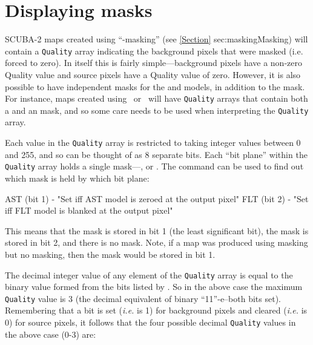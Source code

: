 \section{Displaying masks}
\label{sec:maskshow}

SCUBA-2 maps created using ``-masking'' (see \cref{Section}
{sec:masking}{Masking}) will contain a \texttt{Quality} array indicating the
background pixels that were masked (i.e. forced to zero). In itself this
is fairly simple---background pixels have a non-zero Quality value and
source pixels have a Quality value of zero. However, it is also possible
to have independent masks for the  and  models,
in addition to the  mask. For instance, maps created using
\brightextended\ or \jsageneric\ will have \texttt{Quality} arrays that
contain both a  and an  mask, and so some care needs
to be used when interpreting the \texttt{Quality} array.

Each value in the \texttt{Quality} array is restricted to taking integer values
between 0 and 255, and so can be thought of as 8 separate bits. Each ``bit
plane'' within the \texttt{Quality} array holds a single mask---,
 or . The 
command can be used to find out which mask is held by which bit plane:

\begin{terminalv}
   AST (bit 1) - "Set iff AST model is zeroed at the output pixel"
   FLT (bit 2) - "Set iff FLT model is blanked at the output pixel"
\end{terminalv}

This means that the  mask is stored in bit 1 (the least significant
bit), the  mask is stored in bit 2, and there is no 
mask. Note, if
a map was produced using  masking but no  masking,
then the  mask would be stored in bit 1.

The decimal integer value of any element of the \texttt{Quality} array is
equal to the binary value formed from the bits listed by .
So in the above case the maximum \texttt{Quality} value is 3 (the decimal
equivalent of binary ``11''-e--both bits set). Remembering that a bit is set
(\emph{i.e.} is 1) for background pixels and cleared (\emph{i.e.} is 0) for
source pixels, it follows that the four possible decimal \texttt{Quality}
values in the above case (0-3) are:

